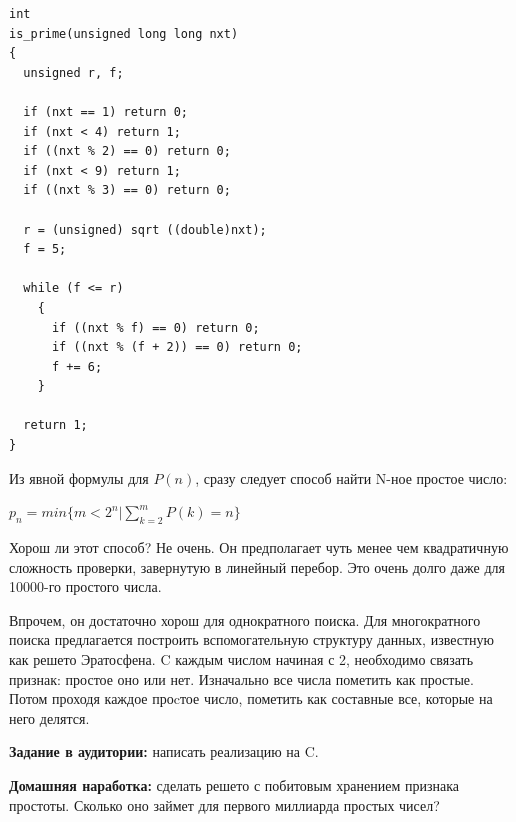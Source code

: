 \documentclass[a4paper,12pt,oneside]{article}
\newif\ifanswers
\begin{document}
\begin{lstlisting}
int
is_prime(unsigned long long nxt)
{
  unsigned r, f;

  if (nxt == 1) return 0;
  if (nxt < 4) return 1;
  if ((nxt % 2) == 0) return 0;
  if (nxt < 9) return 1;
  if ((nxt % 3) == 0) return 0;
  
  r = (unsigned) sqrt ((double)nxt);
  f = 5;

  while (f <= r)
    {
      if ((nxt % f) == 0) return 0;
      if ((nxt % (f + 2)) == 0) return 0;
      f += 6;
    }

  return 1;
}
\end{lstlisting}
\fi

Из явной формулы для $P(n)$, сразу следует способ найти N-ное простое число:

$p_n=min\{m<2^n|\sum\limits_{k=2}^{m}P(k)=n\}$

Хорош ли этот способ? Не очень. Он предполагает чуть менее чем квадратичную сложность проверки, завернутую в линейный перебор. Это очень долго даже для 10000-го простого числа.

Впрочем, он достаточно хорош для однократного поиска. Для многократного поиска предлагается построить вспомогательную структуру данных, известную как решето Эратосфена. C каждым числом начиная с 2, необходимо связать признак: простое оно или нет. Изначально все числа пометить как простые. Потом проходя каждое проcтое число, пометить как составные все, которые на него делятся.

\textbf{Задание в аудитории:} написать реализацию на C.

\ifanswers
Возможный ответ:

\begin{lstlisting}
int *
init_sieve (int nofprimes)
{
  int i, j;
  int *retval;

  retval = calloc (nofprimes, sizeof (int));

  for (i = 2; i * i < nofprimes; ++i)
    if (retval[i] == 0)
      for (j = i * i; j < nofprimes; j += i)
        retval[j] = 1;

  return retval;
}
\end{lstlisting}

Хорош ли этот ответ? В общем да, но следует обратить внимание, что он тратит примерно в 32 раза больше памяти, чем реально нужно для хранения однобитовых признаков.
\fi

\textbf{Домашняя наработка:} сделать решето с побитовым хранением признака простоты. Сколько оно займет для первого миллиарда простых чисел?
\end{document}
